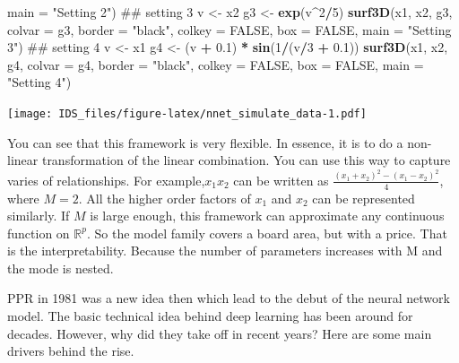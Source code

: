 \documentclass[12pt,]{krantz}
\makeatletter
\newenvironment{Shaded}{\begin{snugshade}}{\end{snugshade}}
\newcommand{\KeywordTok}[1]{\textcolor[rgb]{0.27,0.27,0.27}{\textbf{#1}}}
\newcommand{\DataTypeTok}[1]{\textcolor[rgb]{0.27,0.27,0.27}{#1}}
\newcommand{\DecValTok}[1]{\textcolor[rgb]{0.06,0.06,0.06}{#1}}
\newcommand{\FloatTok}[1]{\textcolor[rgb]{0.06,0.06,0.06}{#1}}
\newcommand{\StringTok}[1]{\textcolor[rgb]{0.5,0.5,0.5}{#1}}
\newcommand{\OtherTok}[1]{\textcolor[rgb]{0.37,0.37,0.37}{#1}}
\newcommand{\OperatorTok}[1]{\textcolor[rgb]{0.43,0.43,0.43}{\textbf{#1}}}
\newcommand{\NormalTok}[1]{#1}
\newenvironment{kframe}{%
\medskip{}
\setlength{\fboxsep}{.8em}
 \def\at@end@of@kframe{}%
 \ifinner\ifhmode%
  \def\at@end@of@kframe{\end{minipage}}%
  \begin{minipage}{\columnwidth}%
 \fi\fi%
 \def\FrameCommand##1{\hskip\@totalleftmargin \hskip-\fboxsep
 \colorbox{shadecolor}{##1}\hskip-\fboxsep
     \hskip-\linewidth \hskip-\@totalleftmargin \hskip\columnwidth}%
 \MakeFramed {\advance\hsize-\width
   \@totalleftmargin\z@ \linewidth\hsize
   \@setminipage}}%
 {\par\unskip\endMakeFramed%
 \at@end@of@kframe}
\renewenvironment{Shaded}{\begin{kframe}}{\end{kframe}}
\theoremstyle{definition}
\theoremstyle{definition}
\theoremstyle{definition}
\theoremstyle{remark}
\makeatother
\begin{document}
\begin{Shaded}
\begin{Highlighting}[]
    \DataTypeTok{main =} \StringTok{"Setting 2"}\NormalTok{)}
\NormalTok{## setting 3}
\NormalTok{v <-}\StringTok{ }\NormalTok{x2}
\NormalTok{g3 <-}\StringTok{ }\KeywordTok{exp}\NormalTok{(v}\OperatorTok{^}\DecValTok{2}\OperatorTok{/}\DecValTok{5}\NormalTok{)}
\KeywordTok{surf3D}\NormalTok{(x1, x2, g3, }\DataTypeTok{colvar =}\NormalTok{ g3, }\DataTypeTok{border =} \StringTok{"black"}\NormalTok{, }\DataTypeTok{colkey =} \OtherTok{FALSE}\NormalTok{, }\DataTypeTok{box =} \OtherTok{FALSE}\NormalTok{, }
    \DataTypeTok{main =} \StringTok{"Setting 3"}\NormalTok{)}
\NormalTok{## setting 4}
\NormalTok{v <-}\StringTok{ }\NormalTok{x1}
\NormalTok{g4 <-}\StringTok{ }\NormalTok{(v }\OperatorTok{+}\StringTok{ }\FloatTok{0.1}\NormalTok{) }\OperatorTok{*}\StringTok{ }\KeywordTok{sin}\NormalTok{(}\DecValTok{1}\OperatorTok{/}\NormalTok{(v}\OperatorTok{/}\DecValTok{3} \OperatorTok{+}\StringTok{ }\FloatTok{0.1}\NormalTok{))}
\KeywordTok{surf3D}\NormalTok{(x1, x2, g4, }\DataTypeTok{colvar =}\NormalTok{ g4, }\DataTypeTok{border =} \StringTok{"black"}\NormalTok{, }\DataTypeTok{colkey =} \OtherTok{FALSE}\NormalTok{, }\DataTypeTok{box =} \OtherTok{FALSE}\NormalTok{, }
    \DataTypeTok{main =} \StringTok{"Setting 4"}\NormalTok{)}
\end{Highlighting}
\end{Shaded}

\texttt{[image: IDS\_files/figure-latex/nnet\_simulate\_data-1.pdf]}

You can see that this framework is very flexible. In essence, it is to
do a non-linear transformation of the linear combination. You can use
this way to capture varies of relationships. For example,\(x_{1}x_{2}\)
can be written as \(\frac{(x_{1}+x_{2})^{2}-(x_{1}-x_{2})^{2}}{4}\),
where \(M=2\). All the higher order factors of \(x_1\) and \(x_2\) can
be represented similarly. If \(M\) is large enough, this framework can
approximate any continuous function on \(\mathbb{R}^{p}\). So the model
family covers a board area, but with a price. That is the
interpretability. Because the number of parameters increases with M and
the mode is nested.

PPR in 1981 was a new idea then which lead to the debut of the neural
network model. The basic technical idea behind deep learning has been
around for decades. However, why did they take off in recent years? Here
are some main drivers behind the rise.
\end{document}
